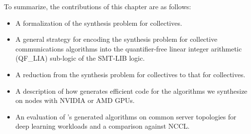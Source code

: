 To summarize, the contributions of this chapter are as follows:
\begin{itemize}
    \item A formalization of the synthesis problem for \broadcasting collectives.
    \item A general strategy for encoding the synthesis problem for
    collective communications algorithms into the quantifier-free linear integer
    arithmetic (QF\_LIA) sub-logic of the SMT-LIB logic.
    \item A reduction from the synthesis problem for \reducing collectives to that for \broadcasting collectives.
    \item A description of how \tool{} generates efficient code for the algorithms we synthesize on nodes with NVIDIA or AMD GPUs.
    \item An evaluation of \tool's generated algorithms on common server topologies for deep learning workloads and a comparison against NCCL.
\end{itemize}


